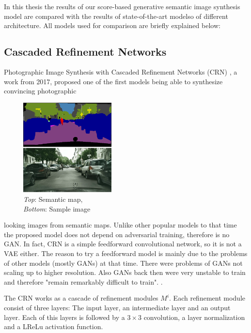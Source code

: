 In this thesis the results of our score-based generative semantic image synthesis model are compared with the results of state-of-the-art modelso of different architecture. All models used for comparison are briefly explained below:

\subsection{Cascaded Refinement Networks} \label{sec:3.2.1}
Photographic Image Synthesis with Cascaded Refinement Networks (CRN) \cite{crn}, a work from 2017, proposed one of the first models being able to synthesize convincing photographic
%
\begin{figure}
    \begin{center}
        \includegraphics[width=0.43\textwidth]{Chapters/figures/crn_example.PNG}
    \end{center}
    \caption{\textit{Top}: Semantic map, \\\textit{Bottom}: Sample image}
\end{figure}
%
looking images from semantic maps. Unlike other popular models to that time the proposed model does not depend on adversarial training, therefore is no GAN. In fact, CRN is a simple feedforward convolutional network, so it is not a VAE either. The reason to try a feedforward model is mainly due to the problems of other models (mostly GANs) at that time. There were problems of GANs not scaling up to higher resolution. Also GANs back then were very unstable to train and therefore "remain remarkably difficult to train".
\cite{crn}.

The CRN works as a cascade of refinement modules $M^i$. Each refinement module consist of three layers: The input layer, an intermediate layer and an output layer. Each of this layers is followed by a $3\times3$ convolution, a layer normalization and a LReLu activation function. 

